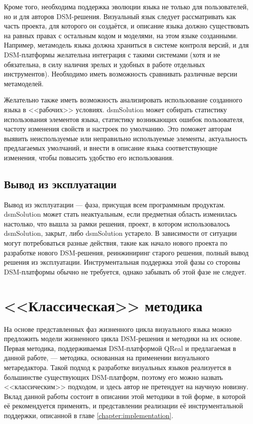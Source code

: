 Кроме того, необходима поддержка эволюции языка не только для пользователей, но и для 
авторов DSM-решения. Визуальный язык следует рассматривать как часть проекта, для которого 
он создаётся, и описание языка должно существовать на равных правах с остальным кодом 
и моделями, на этом языке созданными. Например, метамодель языка должна храниться в 
системе контроля версий, и для DSM-платформы желательна интеграция с такими системами 
(хотя и не обязательна, в силу наличия зрелых и удобных в работе отдельных инструментов). 
Необходимо иметь возможность сравнивать различные версии метамоделей.

Желательно также иметь возможность анализировать использование созданного языка в <<рабочих>> 
условиях. \ac{dsmSolution} может собирать статистику использования элементов языка, статистику 
возникающих ошибок пользователя, частоту изменения свойств и настроек по умолчанию. 
Это поможет авторам выявить неиспользуемые или неправильно используемые элементы, 
актуальность предлагаемых умолчаний, и внести в описание языка соответствующие изменения, 
чтобы повысить удобство его использования.

\subsection{Вывод из эксплуатации}
Вывод из эксплуатации --- фаза, присущая всем программным продуктам. \ac{dsmSolution} может 
стать неактуальным, если предметная область изменилась настолько, что вышла за рамки 
решения, проект, в котором использовалось \ac{dsmSolution}, закрыт, либо \ac{dsmSolution} устарело. 
В зависимости от ситуации могут потребоваться разные действия, такие как начало нового 
проекта по разработке нового DSM-решения, реинжиниринг старого решения, полный вывод 
решения из эксплуатации. Инструментальная поддержка этой фазы со стороны DSM-платформы 
обычно не требуется, однако забывать об этой фазе не следует.

\section{<<Классическая>> методика}
\label{chapter:classicMethodology}
На основе представленных фаз жизненного цикла визуального языка можно предложить модели 
жизненного цикла \ac{DSM}-решения и методики на их основе. Первая методика, поддерживаемая 
\ac{DSM}-платформой QReal и предлагаемая в данной работе, --- методика, основанная на применении 
визуального метаредактора. Такой подход к разработке визуальных языков реализуется в 
большинстве существующих \ac{DSM}-платформ, поэтому его можно назвать <<классическим>> подходом, 
и здесь автор не претендует на научную новизну. Вклад данной работы состоит в описании 
этой методики в той форме, в которой её рекомендуется применять, и представлении 
реализации её инструментальной поддержки, описанной в главе \ref{chapter:implementation}. 


